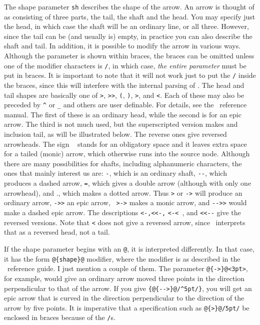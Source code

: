 \documentclass[12pt]{article}
\begin{document}
{The shape parameter \verb.sh. describes the shape of the arrow.  An
arrow is thought of as consisting of three parts, the tail, the shaft
and the head.  You may specify just the head, in which case the shaft
will be an ordinary line, or all three.  However, since the tail can be
(and usually is) empty, in practice you can also describe the shaft and
tail.  In addition, it is possible to modify the arrow in various ways.
Although the parameter is shown within braces, the braces can be omitted
unless one of the modifier characters is \verb./., in which case, {\em
the entire parameter} must be put in braces.  It is important to note
that it will not work just to put the \verb./. inside the braces, since
this will interfere with the internal parsing of \xypic.  The head and
tail shapes are basically one of \index{>}\verb.>., \index{>>}\verb.>>.,
\verb.(., \verb.)., \index{>}\verb*+>+, and \index{<}\verb*+<+.  Each of
these may also be preceded by \index{^}\verb.^. or \index{_}\verb._. and
others are user definable.  For details, see the \xypic\ reference
manual.  The first of these is an ordinary head, while the second is for
an epic arrow.  The third is not much used, but the superscripted
version makes and inclusion tail, as will be illustrated below.  The
reverse ones give reversed arrowheads.  The sign \verb*+ + stands for an
obligatory space and it leaves extra space for a tailed (monic) arrow,
which otherwise runs into the source node.  Although there are many
possibilities for shafts, including alphanumeric characters, the ones
that mainly interest us are:  \index{-}\verb.-., which is an ordinary
shaft, \index{--}\verb.--., which produces a dashed arrow,
\index{=}\verb.=., which gives a double arrow (although with only one
arrowhead), and ., which makes a dotted arrow.  Thus \index{>}\verb.>.
or \index{->}\verb.->. will produce an ordinary arrow,
\index{->>}\verb.->>. an epic arrow, \index{ >->}\verb*+ >->+ makes a
monic arrow, and \index{-->>}\verb.-->>. would make a dashed epic arrow.
The descriptions \index{<-}\index{<<-}\verb.<-,<<-,.  \index{<-<
}\verb*+<-< +, and \index{<<--}\verb.<<--. give the reversed versions.
Note that \index{<}\verb.<. does not give a reversed arrow, since
\xypic\ interprets that as a reversed head, not a tail.

If the shape parameter begins with an \verb.@., it is
interpreted differently.  In that case, it has the form
\verb.@{shape}@. modifier, where the modifier is as
described in the \xypic\ reference guide.  I just mention a couple of
them.  The parameter \verb.@{->}@<3pt>., for example,
would give an ordinary arrow moved three points in the direction
perpendicular to that of the arrow.  If you give
\verb.{@{-->}@/^5pt/}., you will get an epic
arrow that is curved in the direction perpendicular to the direction of
the arrow by five points.  It is imperative that a specification such as
\verb.@{>}@/5pt/. be enclosed in braces because of the
\index{/}\verb./.s.

}
\end{document}
